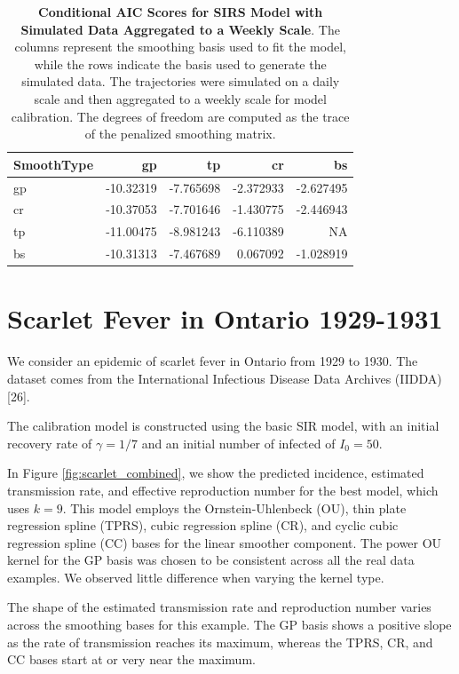 \documentclass[
11pt, %
oneside, %
english, %
singlespacing, %
]{macthesis} %
\begin{document}
\begin{table}[!h]
\centering
\caption{\label{tab:aic-table-sim-agg}\textbf{Conditional AIC Scores for SIRS Model with Simulated Data Aggregated to a Weekly Scale}. The columns represent the smoothing basis used to fit the model, while the rows indicate the basis used to generate the simulated data. The trajectories were simulated on a daily scale and then aggregated to a weekly scale for model calibration. The degrees of freedom are computed as the trace of the penalized smoothing matrix.}
\centering
\begin{tabular}[t]{lrrrr}
\toprule
SmoothType & gp & tp & cr & bs\\
\midrule
gp & -10.32319 & -7.765698 & -2.372933 & -2.627495\\
cr & -10.37053 & -7.701646 & -1.430775 & -2.446943\\
tp & -11.00475 & -8.981243 & -6.110389 & NA\\
bs & -10.31313 & -7.467689 & 0.067092 & -1.028919\\
\bottomrule
\end{tabular}
\end{table}

\section{Scarlet Fever in Ontario 1929-1931}\label{scarlet}

We consider an epidemic of scarlet fever in Ontario from 1929 to 1930. The dataset comes from the International Infectious Disease Data Archives (IIDDA) {[}26{]}.

The calibration model is constructed using the basic SIR model, with an initial recovery rate of \(\gamma = 1/7\) and an initial number of infected of \(I_0 = 50\).

In Figure \ref{fig:scarlet_combined}, we show the predicted incidence, estimated transmission rate, and effective reproduction number for the best model, which uses \(k = 9\). This model employs the Ornstein-Uhlenbeck (OU), thin plate regression spline (TPRS), cubic regression spline (CR), and cyclic cubic regression spline (CC) bases for the linear smoother component. The power OU kernel for the GP basis was chosen to be consistent across all the real data examples. We observed little difference when varying the kernel type.

The shape of the estimated transmission rate and reproduction number varies across the smoothing bases for this example. The GP basis shows a positive slope as the rate of transmission reaches its maximum, whereas the TPRS, CR, and CC bases start at or very near the maximum.
\end{document}
